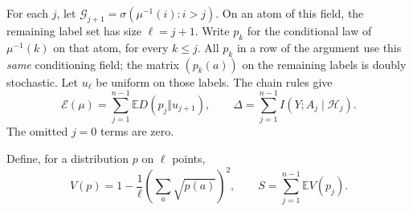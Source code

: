 \documentclass[11pt]{article}
\numberwithin{equation}{section}
\theoremstyle{definition}\newtheorem{definition}[theorem]{Definition}
\theoremstyle{remark}\newtheorem{remark}[theorem]{Remark}
\newcommand{\E}{\mathbb E}
\newcommand{\Ent}{\mathcal E}
\begin{document}
For each $j$, let
$\mathcal G_{j+1}=\sigma(\mu^{-1}(i):i>j)$. On an atom of this field, the
remaining label set has size $\ell=j+1$. Write $p_k$ for the conditional
law of $\mu^{-1}(k)$ on that atom, for every $k\le j$. All $p_k$ in a row
of the argument use this \emph{same} conditioning field; the matrix
$(p_k(a))$ on the remaining labels is doubly stochastic. Let $u_\ell$ be
uniform on those labels. The chain rules give
\begin{equation}\label{eq:chain}
 \Ent(\mu)=\sum_{j=1}^{n-1}\E D(p_j\Vert u_{j+1}),
 \qquad
 \Delta=\sum_{j=1}^{n-1}I(Y;A_j\mid\mathcal H_j).
\end{equation}
The omitted $j=0$ terms are zero.

Define, for a distribution $p$ on $\ell$ points,
\[
 V(p)=1-\frac1\ell\left(\sum_a\sqrt{p(a)}\right)^2,
 \qquad S=\sum_{j=1}^{n-1}\E V(p_j).
\]
\end{document}
